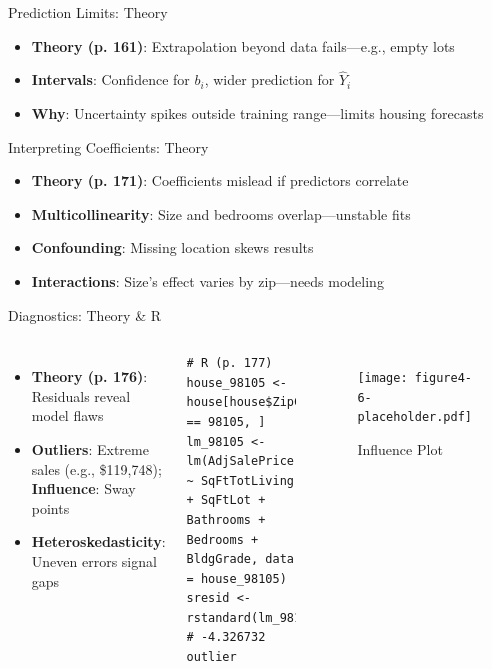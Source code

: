 \documentclass{beamer}
\begin{document}
	\begin{frame}{Prediction Limits: Theory}
		\begin{itemize}
			\item \textbf{Theory (p. 161)}: Extrapolation beyond data fails—e.g., empty lots
			\item \textbf{Intervals}: Confidence for $b_i$, wider prediction for $\hat{Y}_i$
			\item \textbf{Why}: Uncertainty spikes outside training range—limits housing forecasts
		\end{itemize}
	\end{frame}
	
	\begin{frame}{Interpreting Coefficients: Theory}
		\begin{itemize}
			\item \textbf{Theory (p. 171)}: Coefficients mislead if predictors correlate
			\item \textbf{Multicollinearity}: Size and bedrooms overlap—unstable fits
			\item \textbf{Confounding}: Missing location skews results
			\item \textbf{Interactions}: Size’s effect varies by zip—needs modeling
		\end{itemize}
	\end{frame}
	
	\begin{frame}[fragile]{Diagnostics: Theory \& R}
		\begin{columns}
			\begin{itemize}
				\item \textbf{Theory (p. 176)}: Residuals reveal model flaws
				\item \textbf{Outliers}: Extreme sales (e.g., \$119,748); \textbf{Influence}: Sway points
				\item \textbf{Heteroskedasticity}: Uneven errors signal gaps
			\end{itemize}
			\begin{lstlisting}
# R (p. 177)
house_98105 <- house[house$ZipCode == 98105, ]
lm_98105 <- lm(AdjSalePrice ~ SqFtTotLiving + SqFtLot + Bathrooms +
Bedrooms + BldgGrade, data = house_98105)
sresid <- rstandard(lm_98105)  # -4.326732 outlier
			\end{lstlisting}
			\begin{figure}
				\texttt{[image: figure4-6-placeholder.pdf]}
				\caption{Influence Plot}
			\end{figure}
		\end{columns}
	\end{frame}
	
\end{document}
